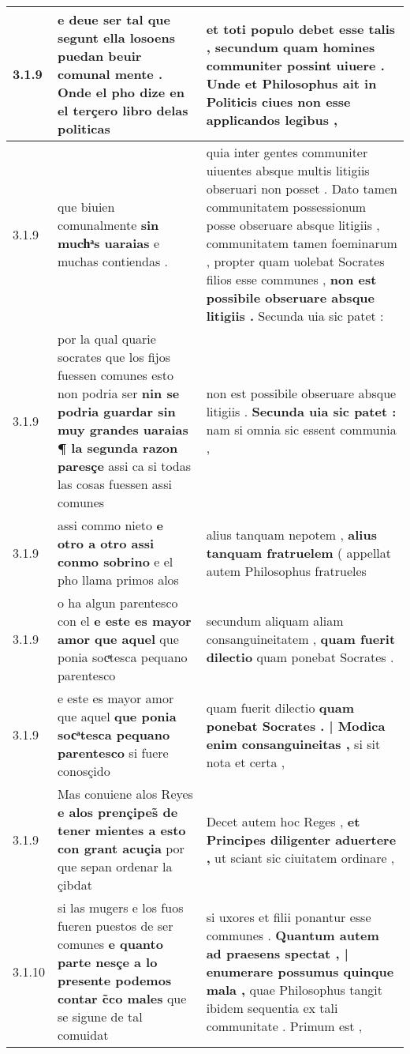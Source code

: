 \begin{tabular}{|p{1cm}|p{6.5cm}|p{6.5cm}|}
3.1.9 & e deue ser tal \textbf{ que segunt ella losoens puedan beuir comunal mente . } Onde el pho dize en el terçero libro delas politicas & et toti populo debet esse talis , \textbf{ secundum quam homines communiter possint uiuere . } Unde et Philosophus ait in Politicis ciues non esse applicandos legibus , \\\hline
3.1.9 & que biuien comunalmente \textbf{ sin muchͣs uaraias } e muchas contiendas . & quia inter gentes communiter uiuentes absque multis litigiis obseruari non posset . Dato tamen communitatem possessionum posse obseruare absque litigiis , communitatem tamen foeminarum , propter quam uolebat Socrates filios esse communes , \textbf{ non est possibile obseruare absque litigiis . } Secunda uia sic patet : \\\hline
3.1.9 & por la qual quarie socrates que los fijos fuessen comunes esto non podria ser \textbf{ nin se podria guardar sin muy grandes uaraias ¶ la segunda razon paresçe } assi ca si todas las cosas fuessen assi comunes & non est possibile obseruare absque litigiis . \textbf{ Secunda uia sic patet : } nam si omnia sic essent communia , \\\hline
3.1.9 & assi commo nieto \textbf{ e otro a otro assi conmo sobrino } e el pho llama primos alos & alius tanquam nepotem , \textbf{ alius tanquam fratruelem } ( appellat autem Philosophus fratrueles \\\hline
3.1.9 & o ha algun parentesco con el \textbf{ e este es mayor amor que aquel } que ponia socͣtesca pequano parentesco & secundum aliquam aliam consanguineitatem , \textbf{ quam fuerit dilectio } quam ponebat Socrates . \\\hline
3.1.9 & e este es mayor amor que aquel \textbf{ que ponia socͣtesca pequano parentesco } si fuere conosçido & quam fuerit dilectio \textbf{ quam ponebat Socrates . | Modica enim consanguineitas , } si sit nota et certa , \\\hline
3.1.9 & Mas conuiene alos Reyes \textbf{ e alos prençipes̃ de tener mientes a esto con grant acuçia } por que sepan ordenar la çibdat & Decet autem hoc Reges , \textbf{ et Principes diligenter aduertere , } ut sciant sic ciuitatem ordinare , \\\hline
3.1.10 & si las mugers e los fuos fueren puestos de ser comunes \textbf{ e quanto parte nesçe a lo presente podemos contar c̃co males } que se sigune de tal comuidat & si uxores et filii ponantur esse communes . \textbf{ Quantum autem ad praesens spectat , | enumerare possumus quinque mala , } quae Philosophus tangit ibidem sequentia ex tali communitate . Primum est , \\\hline

\end{tabular}
